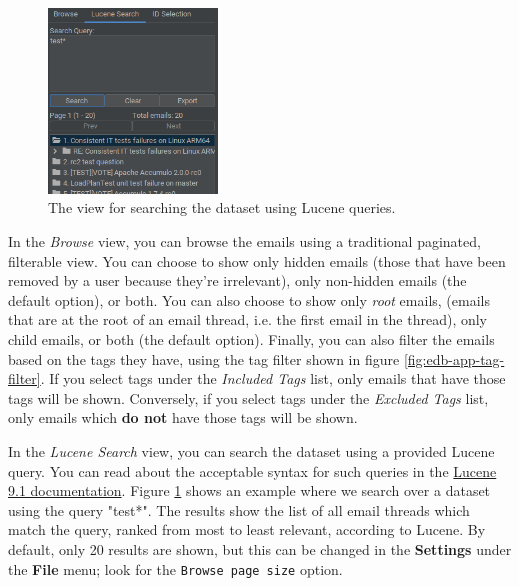\documentclass[a4paper, 12pt]{article}
\begin{document}
			\begin{figure}
				\includegraphics[width=0.4\textwidth]{img/edb-app_lucene-search-narrow.png}
				\caption{The view for searching the dataset using Lucene queries.}
				\label{fig:edb-app-lucene-search}
			\end{figure}
		
			In the \textit{Browse} view, you can browse the emails using a traditional paginated, filterable view. You can choose to show only hidden emails (those that have been removed by a user because they're irrelevant), only non-hidden emails (the default option), or both. You can also choose to show only \textit{root} emails, (emails that are at the root of an email thread, i.e. the first email in the thread), only child emails, or both (the default option). Finally, you can also filter the emails based on the tags they have, using the tag filter shown in figure \ref{fig:edb-app-tag-filter}. If you select tags under the \textit{Included Tags} list, only emails that have those tags will be shown. Conversely, if you select tags under the \textit{Excluded Tags} list, only emails which \textbf{do not} have those tags will be shown.
			

		
			In the \textit{Lucene Search} view, you can search the dataset using a provided Lucene query. You can read about the acceptable syntax for such queries in the \href{https://lucene.apache.org/core/9_1_0/queryparser/org/apache/lucene/queryparser/classic/package-summary.html}{Lucene 9.1 documentation}. Figure \ref{fig:edb-app-lucene-search} shows an example where we search over a dataset using the query "test*". The results show the list of all email threads which match the query, ranked from most to least relevant, according to Lucene. By default, only 20 results are shown, but this can be changed in the \textbf{Settings} under the \textbf{File} menu; look for the \texttt{Browse page size} option.
			
\end{document}
